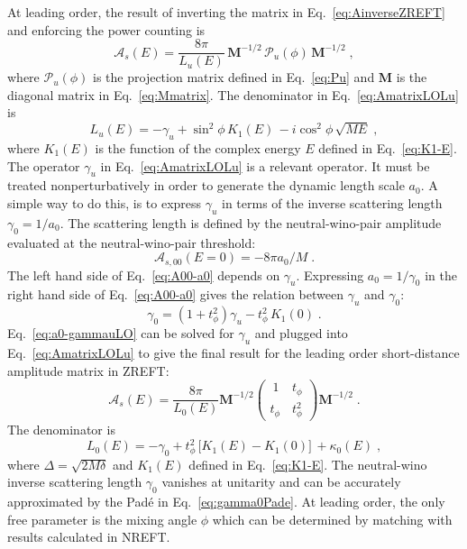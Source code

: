 \documentclass[%
 reprint,
 amsmath,amssymb,
 aps,
]{revtex4-1}
\begin{document}
At leading order, the result of inverting the matrix in Eq.~\eqref{eq:AinverseZREFT} and enforcing the power counting is
\begin{equation}
\label{eq:AmatrixLOLu}
\bm{\mathcal{A}}_s(E) = 
\frac{8\pi}{L_u(E)}  \, 
\bm{M}^{-1/2} \, \bm{\mathcal{P}}_u(\phi)\,  \bm{M}^{-1/2} \;,
\end{equation}
where $\bm{\mathcal{P}}_u(\phi)$ is the projection matrix defined in Eq.~\eqref{eq:Pu} and $\bm{M}$ is the diagonal matrix in Eq.~\eqref{eq:Mmatrix}. 
The denominator in Eq.~\eqref{eq:AmatrixLOLu} is
\begin{equation}
L_u(E)=-\gamma_u +\sin^2\phi\, K_1(E)\,  - i \cos^2\phi\, \sqrt{ME} \;,
\label{eq:Lu}
\end{equation}
where $K_1(E)$ is the function of the complex energy $E$ defined in Eq.~\eqref{eq:K1-E}.
The operator $\gamma_u$ in Eq.~\eqref{eq:AmatrixLOLu} is a relevant operator.
It must be treated nonperturbatively in order to generate the dynamic length scale $a_0$.
A simple way to do this, is to express $\gamma_u$ in terms of the inverse scattering length $\gamma_0 = 1/a_0$.
The scattering length is defined by the neutral-wino-pair amplitude evaluated at the neutral-wino-pair threshold:
\begin{equation}
\mathcal{A}_{s,00}(E=0) = - 8\pi a_0 /M \;.
\label{eq:A00-a0}
\end{equation}
The left hand side of Eq.~\eqref{eq:A00-a0} depends on $\gamma_u$. Expressing $a_0 = 1/\gamma_0$ in the right hand side of Eq.~\eqref{eq:A00-a0} gives the relation between $\gamma_u$ and $\gamma_0$:
\begin{equation}
\gamma_0 = (1 +  t_\phi^2)\gamma_u - t_\phi^2\, K_1(0) \;.
\label{eq:a0-gammauLO}
\end{equation}
Eq.~\eqref{eq:a0-gammauLO} can be solved for $\gamma_u$ and plugged into Eq.~\eqref{eq:AmatrixLOLu} to give the final result for the leading order short-distance amplitude matrix in ZREFT:
\begin{equation}
\label{eq:AmatrixLOL0}
\bm{\mathcal{A}}_s(E) = 
 \frac{8\pi}{L_0(E)}  \bm{M}^{-1/2}   
\begin{pmatrix}    ~1~     & t_\phi\\  t_\phi & t_\phi^2 \end{pmatrix}  \bm{M}^{-1/2} \;.
\end{equation}
The denominator is
\begin{equation}
L_0(E) =-\gamma_0  + t_\phi^2\, \big[ K_1(E) - K_1(0) \big]\, + \kappa_0(E) \;,
\label{eq:L0-E}
\end{equation}
where $\Delta = \sqrt{2M\delta}$ and $K_1(E)$ defined in Eq.~\eqref{eq:K1-E}. 
The neutral-wino inverse scattering length $\gamma_0$ vanishes at unitarity and can be accurately approximated by the Pad\'e in Eq.~\eqref{eq:gamma0Pade}.
At leading order, the only free parameter is the mixing angle $\phi$ which can be determined by matching with results calculated in NREFT.
\end{document}
